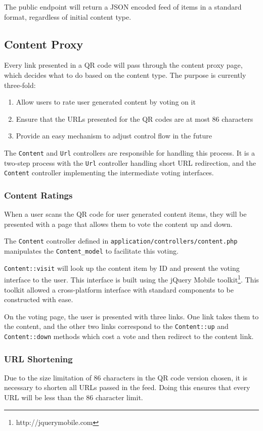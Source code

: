 The public endpoint will return a JSON encoded feed of items in a standard format, regardless of initial content type.

\subsection{Content Proxy}
Every link presented in a QR code will pass through the content proxy page, which decides what to do based on the content type. The purpose is currently three-fold:

\begin{enumerate}
	\item Allow users to rate user generated content by voting on it
	\item Ensure that the URLs presented for the QR codes are at most 86 characters
	\item Provide an easy mechanism to adjust control flow in the future
\end{enumerate}

The \texttt{Content} and \texttt{Url} controllers are responsible for handling this process. It is a two-step process with the \texttt{Url} controller handling short URL redirection, and the \texttt{Content} controller implementing the intermediate voting interfaces.

\subsubsection{Content Ratings}
When a user scans the QR code for user generated content items, they will be presented with a page that allows them to vote the content up and down.

The \texttt{Content} controller defined in \texttt{application/controllers/content.php} manipulates the \texttt{Content\_model} to facilitate this voting.

\texttt{Content::visit} will look up the content item by ID and present the voting interface to the user. This interface is built using the jQuery Mobile toolkit\footnote{http://jquerymobile.com}. This toolkit allowed a cross-platform interface with standard components to be constructed with ease.

On the voting page, the user is presented with three links. One link takes them to the content, and the other two links correspond to the \texttt{Content::up} and \texttt{Content::down} methods which cost a vote and then redirect to the content link.

\subsubsection{URL Shortening}
Due to the size limitation of 86 characters in the QR code version chosen, it is necessary to shorten all URLs passed in the feed. Doing this ensures that every URL will be less than the 86 character limit.

